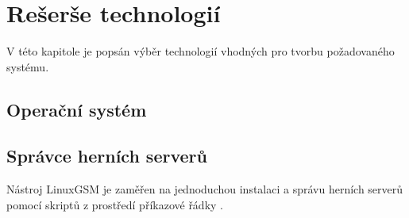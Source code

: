 \chapter{Rešerše technologií}

V této kapitole je popsán výběr technologií vhodných pro tvorbu požadovaného systému.

\section{Operační systém}
\section{Správce herních serverů}
Nástroj LinuxGSM je zaměřen na jednoduchou instalaci a správu herních serverů pomocí skriptů z prostředí příkazové řádky \cite{linuxgsm}. 
